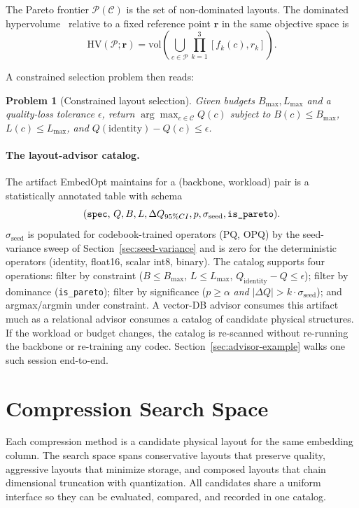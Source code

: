 \documentclass[sigconf]{acmart}
\newtheorem{problem}{Problem}
\newcommand{\method}{EmbedOpt}
\newcommand{\HV}{\mathrm{HV}}
\begin{document}
The Pareto frontier $\mathcal{P}(\mathcal{C})$ is the set of non-dominated layouts. The dominated hypervolume~\cite{zitzler1999multiobjective} relative to a fixed reference point $\mathbf{r}$ in the same objective space is
\begin{equation}
  \HV(\mathcal{P}; \mathbf{r}) = \mathrm{vol}\!\left( \bigcup_{c \in \mathcal{P}} \prod_{k=1}^{3} [f_k(c), r_k] \right).
\end{equation}

A constrained selection problem then reads:
\begin{problem}[Constrained layout selection]
\label{prob:constrained}
Given budgets $B_{\max}, L_{\max}$ and a quality-loss tolerance $\epsilon$, return $\arg\max_{c \in \mathcal{C}} Q(c)$ subject to $B(c) \le B_{\max}$, $L(c) \le L_{\max}$, and $Q(\mathrm{identity}) - Q(c) \le \epsilon$.
\end{problem}

\paragraph{The layout-advisor catalog.}
The artifact \method{} maintains for a (backbone, workload) pair is a statistically annotated table with schema
\[
\text{(\texttt{spec}, } Q, B, L, \Delta Q_{95\%CI}, p, \sigma_{\text{seed}}, \texttt{is\_pareto}).
\]
$\sigma_{\text{seed}}$ is populated for codebook-trained operators (PQ, OPQ) by the seed-variance sweep of Section~\ref{sec:seed-variance} and is zero for the deterministic operators (identity, float16, scalar int8, binary). The catalog supports four operations: filter by constraint ($B \le B_{\max}$, $L \le L_{\max}$, $Q_{\mathrm{identity}} - Q \le \epsilon$); filter by dominance (\texttt{is\_pareto}); filter by significance ($p \ge \alpha$ \emph{and} $|\Delta Q| > k \cdot \sigma_{\text{seed}}$); and argmax/argmin under constraint. A vector-DB advisor consumes this artifact much as a relational advisor consumes a catalog of candidate physical structures. If the workload or budget changes, the catalog is re-scanned without re-running the backbone or re-training any codec. Section~\ref{sec:advisor-example} walks one such session end-to-end.

\section{Compression Search Space}
\label{sec:method}

Each compression method is a candidate physical layout for the same embedding column. The search space spans conservative layouts that preserve quality, aggressive layouts that minimize storage, and composed layouts that chain dimensional truncation with quantization. All candidates share a uniform interface so they can be evaluated, compared, and recorded in one catalog.
\end{document}
